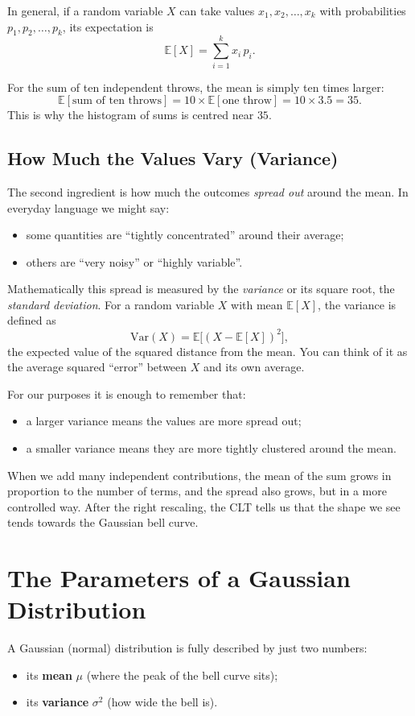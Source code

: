 In general, if a random variable \(X\) can take values \(x_1, x_2, \dots, x_k\) with probabilities \(p_1, p_2, \dots, p_k\), its expectation is
\[
  \mathbb{E}[X] = \sum_{i=1}^{k} x_i\,p_i.
\]

For the sum of ten independent throws, the mean is simply ten times larger:
\[
  \mathbb{E}[\text{sum of ten throws}] = 10 \times \mathbb{E}[\text{one throw}] = 10 \times 3.5 = 35.
\]
This is why the histogram of sums is centred near \(35\).

\subsection{How Much the Values Vary (Variance)}
The second ingredient is how much the outcomes \emph{spread out} around the mean.  In everyday language we might say:
\begin{itemize}
  \item some quantities are ``tightly concentrated'' around their average;
  \item others are ``very noisy'' or ``highly variable''.
\end{itemize}

Mathematically this spread is measured by the \emph{variance} or its square root, the \emph{standard deviation}.  For a random variable \(X\) with mean \(\mathbb{E}[X]\), the variance is defined as
\[
  \mathrm{Var}(X) = \mathbb{E}\bigl[(X - \mathbb{E}[X])^2\bigr],
\]
the expected value of the squared distance from the mean.  You can think of it as the average squared ``error'' between \(X\) and its own average.

For our purposes it is enough to remember that:
\begin{itemize}
  \item a larger variance means the values are more spread out;
  \item a smaller variance means they are more tightly clustered around the mean.
\end{itemize}

When we add many independent contributions, the mean of the sum grows in proportion to the number of terms, and the spread also grows, but in a more controlled way.  After the right rescaling, the CLT tells us that the shape we see tends towards the Gaussian bell curve.

\section{The Parameters of a Gaussian Distribution}
A Gaussian (normal) distribution is fully described by just two numbers:
\begin{itemize}
  \item its \textbf{mean} \(\mu\) (where the peak of the bell curve sits);
  \item its \textbf{variance} \(\sigma^2\) (how wide the bell is).
\end{itemize}

